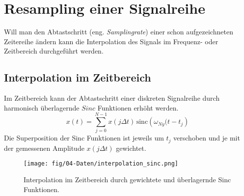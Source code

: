 \section{Resampling einer Signalreihe}
Will man den Abtastschritt (eng. \textsl{Samplingrate}) einer schon aufgezeichneten Zeitereihe ändern kann die Interpolation des Signals im Frequenz- oder Zeitbereich durchgeführt werden.

\subsection{Interpolation im Zeitbereich}
Im Zeitbereich kann der Abtastschritt einer diskreten Signalreihe durch harmonisch überlagernde $Sinc$ Funktionen erhöht werden.
\begin{equation}
x(t) = \sum_{j=0}^{N-1} x(j \Delta t) \, \mbox{sinc} \left(\omega_{Ny}(t-{t_j}\right)
\end{equation}
Die Superposition der Sinc Funktionen ist jeweils um $t_j$ verschoben und je mit der gemessenen Amplitude $x(j\Delta t)$ gewichtet.

\begin{figure}[h!]
\centering
\texttt{[image: fig/04-Daten/interpolation\_sinc.png]}
\caption{Interpolation im Zeitbereich durch gewichtete und überlagernde Sinc Funktionen.}
\end{figure}
